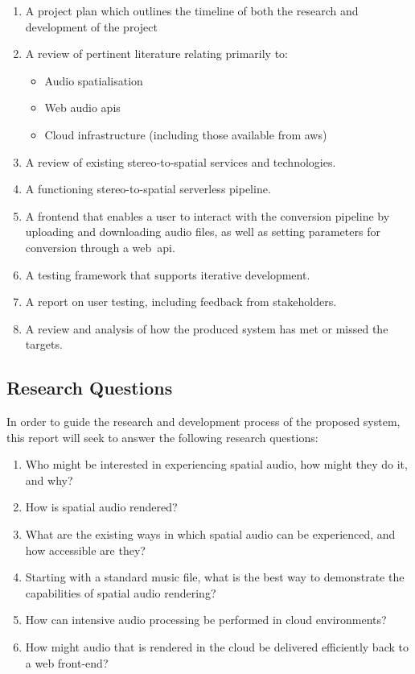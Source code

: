 \begin{enumerate}
    \item A project plan which outlines the timeline of both the research and development of the project
    \item A review of pertinent literature relating primarily to:
    \begin{itemize}
        \item Audio spatialisation
        \item Web audio \glspl{api}
        \item Cloud infrastructure (including those available from \gls{aws})
    \end{itemize}
    \item A review of existing stereo-to-spatial services and technologies.
    \item A functioning stereo-to-spatial serverless pipeline.
    \item A frontend that enables a user to interact with the conversion pipeline by uploading and downloading audio files, as well as setting parameters for conversion through a web~\gls{api}.
    \item A testing framework that supports iterative development.
    \item A report on user testing, including feedback from stakeholders.
    \item A review and analysis of how the produced system has met or missed the targets.
\end{enumerate}

\subsection{Research Questions}\label{subsec:research-questions}

In order to guide the research and development process of the proposed system, this report will seek to answer the following research questions:

\begin{enumerate}
    \item Who might be interested in experiencing spatial audio, how might they do it, and why?
    \item How is spatial audio rendered?
    \item What are the existing ways in which spatial audio can be experienced, and how accessible are they?
    \item Starting with a standard music file, what is the best way to demonstrate the capabilities of spatial audio rendering?
    \item How can intensive audio processing be performed in cloud environments?
    \item How might audio that is rendered in the cloud be delivered efficiently back to a web front-end?

\end{enumerate}